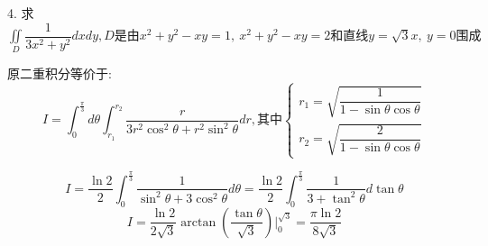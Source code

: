 
4. 求$\iint\limits_{D}\dfrac{1}{3x^2+y^2}dxdy,D\text{是由}x^2+y^2-xy=1,\ x^2+y^2-xy=2\text{和直线}y=\sqrt{3}x,\ y=0\text{围成}$
\begin{solution}
	
	原二重积分等价于: 
	$$I=\int_{0}^{\frac{\pi}{3}}d\theta\int_{r_{1}}^{r_{2}}\dfrac{r}{3r^2\cos ^2\theta+r^2\sin^2\theta}dr,\text{其中}\left\lbrace 
	\begin{array}{l}
		r_{1}=\sqrt{\dfrac{1}{1-\sin \theta\cos\theta}}\\
		r_{2}=\sqrt{\dfrac{2}{1-\sin \theta\cos\theta}}
	\end{array}
	\right. $$
	
	$$I=\frac{\ln 2}{2}\int_{0}^{\frac{\pi}{3}}\dfrac{1}{\sin^2\theta+3\cos^2\theta}d\theta=\frac{\ln 2}{2}\int_{0}^{\frac{\pi}{3}}\dfrac{1}{3+\tan^2\theta}d\tan \theta$$
	$$I=\frac{\ln 2}{2\sqrt{3}}\arctan(\frac{\tan\theta}{\sqrt{3}})|_{0}^{\sqrt{3}}=\frac{\pi \ln 2}{8\sqrt{3}}$$
\end{solution}

